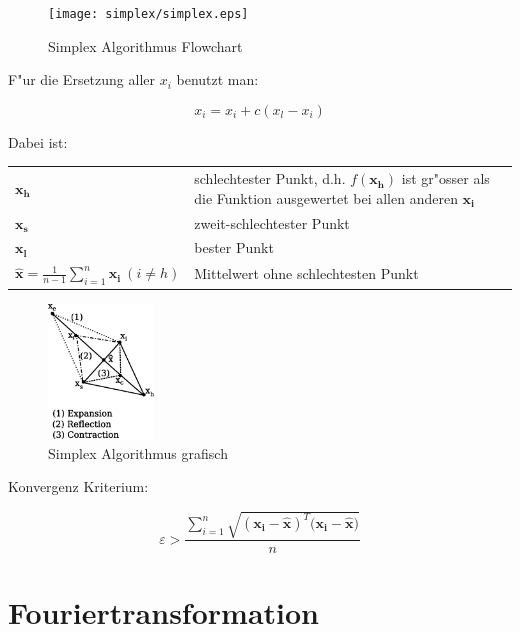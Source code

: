 \documentclass[german, 10pt, a4paper, twocolumn]{scrartcl}
\begin{document}
\begin{figure}[hbt]
 \begin{center}
 	\texttt{[image: simplex/simplex.eps]}
 \end{center}
 \label{simplex}
 \caption{Simplex Algorithmus Flowchart}
\end{figure}

F"ur die Ersetzung aller $x_i$ benutzt man:

\begin{displaymath}
	x_i = x_i + c(x_l - x_i)
\end{displaymath}

Dabei ist:\\

\small
\begin{tabular}{lp{4cm}}
	$\mathbf{x_h}$ &							schlechtester Punkt, d.h. $f(\mathbf{x_h})$ ist gr"osser als die Funktion ausgewertet bei allen anderen $\mathbf{x_i}$\\
	$\mathbf{x_s}$ &							zweit-schlechtester Punkt\\
	$\mathbf{x_l}$ &							bester Punkt\\
	$\mathbf{\hat{x}}=\frac{1}{n-1}\sum^n_{i=1}\mathbf{x_i}\: (i\neq h)$ &	Mittelwert ohne schlechtesten Punkt	
\end{tabular}
\normalsize

\begin{figure}[hbt]
 \begin{center}
 	\includegraphics[width=0.25\textwidth]{simplex2.eps}
 \end{center}
 \label{simplex}
 \caption{Simplex Algorithmus grafisch}
\end{figure}

Konvergenz Kriterium:

\begin{displaymath}
	\varepsilon > \frac{\sum^n_{i=1}\sqrt{(\mathbf{x_i} - \mathbf{\hat{x}})^T (\mathbf{x_i} - \mathbf{\hat{x})}}}{n}
\end{displaymath}

\section{Fouriertransformation}
\end{document}
